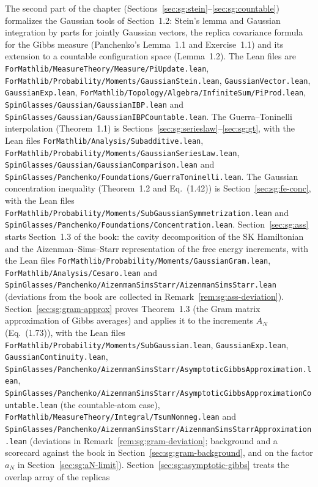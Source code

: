The second part of the chapter (Sections~\ref{sec:sg:stein}--\ref{sec:sg:countable}) formalizes the Gaussian tools of
Section~1.2: Stein's lemma and Gaussian integration by parts for jointly Gaussian vectors, the replica covariance
formula for the Gibbs measure (Panchenko's Lemma~1.1 and Exercise~1.1) and its extension to a countable
configuration space (Lemma~1.2). The Lean files are \texttt{ForMathlib/MeasureTheory/Measure/PiUpdate.lean},
\texttt{ForMathlib/Probability/Moments/GaussianStein.lean}, \texttt{GaussianVector.lean}, \texttt{GaussianExp.lean},
\texttt{ForMathlib/Topology/Algebra/InfiniteSum/PiProd.lean}, \texttt{SpinGlasses/Gaussian/GaussianIBP.lean} and
\texttt{SpinGlasses/Gaussian/GaussianIBPCountable.lean}. The Guerra--Toninelli interpolation (Theorem~1.1) is
Sections~\ref{sec:sg:serieslaw}--\ref{sec:sg:gt}, with the Lean files
\texttt{ForMathlib/Analysis/Subadditive.lean}, \texttt{ForMathlib/Probability/Moments/GaussianSeriesLaw.lean},
\texttt{SpinGlasses/Gaussian/GaussianComparison.lean} and \texttt{SpinGlasses/Panchenko/Foundations/GuerraToninelli.lean}. The Gaussian
concentration inequality (Theorem~1.2 and Eq.~(1.42)) is Section~\ref{sec:sg:fe-conc}, with the Lean files
\texttt{ForMathlib/Probability/Moments/SubGaussianSymmetrization.lean} and \texttt{SpinGlasses/Panchenko/Foundations/Concentration.lean}.
Section~\ref{sec:sg:ass} starts Section~1.3 of the book: the cavity decomposition of the SK Hamiltonian and the
Aizenman--Sims--Starr representation of the free energy increments, with the Lean files
\texttt{ForMathlib/Probability/Moments/GaussianGram.lean}, \texttt{ForMathlib/Analysis/Cesaro.lean} and
\texttt{SpinGlasses/Panchenko/AizenmanSimsStarr/AizenmanSimsStarr.lean} (deviations from the book are collected in
Remark~\ref{rem:sg:ass-deviation}). Section~\ref{sec:sg:gram-approx} proves Theorem~1.3 (the Gram matrix approximation of Gibbs
averages) and applies it to the increments $A_N$ (Eq.~(1.73)), with the Lean files
\texttt{ForMathlib/Probability/Moments/SubGaussian.lean}, \texttt{GaussianExp.lean}, \texttt{GaussianContinuity.lean},
\texttt{SpinGlasses/Panchenko/AizenmanSimsStarr/AsymptoticGibbsApproximation.lean}, \texttt{SpinGlasses/Panchenko/AizenmanSimsStarr/AsymptoticGibbsApproximationCountable.lean} (the countable-atom case), \texttt{ForMathlib/MeasureTheory/Integral/TsumNonneg.lean} and \texttt{SpinGlasses/Panchenko/AizenmanSimsStarr/AizenmanSimsStarrApproximation.lean}
(deviations in Remark~\ref{rem:sg:gram-deviation}; background and a scorecard against the book in Section~\ref{sec:sg:gram-background}, and on the factor $a_N$ in Section~\ref{sec:sg:aN-limit}). Section~\ref{sec:sg:asymptotic-gibbs} treats the overlap array of the replicas
